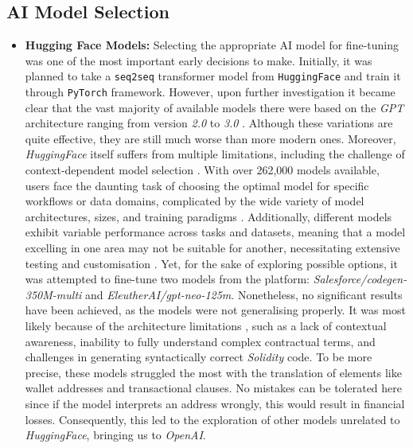\subsection{AI Model Selection}

\begin{itemize}
    \item \textbf{Hugging Face Models:} Selecting the appropriate AI model for fine-tuning was one of the most important early decisions to make. Initially, it was planned to take a \texttt{seq2seq} transformer model from \texttt{HuggingFace} and train it through \texttt{PyTorch} framework. However, upon further investigation it became clear that the vast majority of available models there were based on the \textit{GPT} architecture ranging from version \textit{2.0} to \textit{3.0} \cite{GerstmayrEtAl2024, Campesato2023}. Although these variations are quite effective, they are still much worse than more modern ones. Moreover, \textit{HuggingFace} itself suffers from multiple limitations, including the challenge of context-dependent model selection \cite{NarayananEtAl2023}. With over 262,000 models available, users face the daunting task of choosing the optimal model for specific workflows or data domains, complicated by the wide variety of model architectures, sizes, and training paradigms \cite{Jones2024, NarayananEtAl2023}. Additionally, different models exhibit variable performance across tasks and datasets, meaning that a model excelling in one area may not be suitable for another, necessitating extensive testing and customisation \cite{NarayananEtAl2023, Campesato2023}. Yet, for the sake of exploring possible options, it was attempted to fine-tune two models from the platform: \textit{Salesforce/codegen-350M-multi} and \textit{EleutherAI/gpt-neo-125m}. Nonetheless, no significant results have been achieved, as the models were not generalising properly. It was most likely because of the architecture limitations \cite{LucianoEtAl2020}, such as a lack of contextual awareness, inability to fully understand complex contractual terms, and challenges in generating syntactically correct \textit{Solidity} code. To be more precise, these models struggled the most with the translation of elements like wallet addresses and transactional clauses. No mistakes can be tolerated here since if the model interprets an address wrongly, this would result in financial losses. Consequently, this led to the exploration of other models unrelated to \textit{HuggingFace}, bringing us to \textit{OpenAI}. 

\end{itemize}
